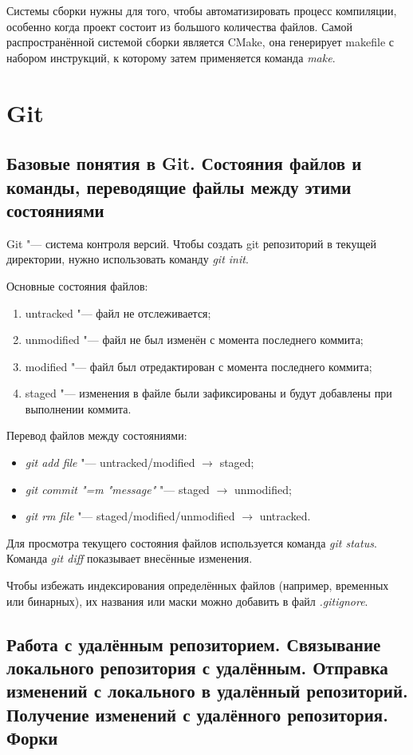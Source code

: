 \documentclass[12pt]{article}
\begin{document}
Системы сборки нужны для того, чтобы автоматизировать процесс компиляции, особенно когда проект состоит из большого количества файлов. Самой распространённой системой сборки является CMake, она генерирует makefile с набором инструкций, к которому затем применяется команда \textit{make}.

\section{Git}

\subsection{Базовые понятия в Git. Состояния файлов и команды, переводящие файлы между этими состояниями}
Git "--- система контроля версий. Чтобы создать git репозиторий в текущей директории, нужно использовать команду \textit{git init}.

Основные состояния файлов:
\begin{enumerate}
\item untracked "--- файл не отслеживается;
\item unmodified "--- файл не был изменён с момента последнего коммита;
\item modified "--- файл был отредактирован с момента последнего коммита;
\item staged "--- изменения в файле были зафиксированы и будут добавлены при выполнении коммита.
\end{enumerate}

Перевод файлов между состояниями:
\begin{itemize}
\item \textit{git add file} "--- untracked/modified $\rightarrow$ staged;
\item \textit{git commit "=m "message"} "--- staged $\rightarrow$ unmodified;
\item \textit{git rm file} "--- staged/modified/unmodified $\rightarrow$ untracked.
\end{itemize}

Для просмотра текущего состояния файлов используется команда \textit{git status}. Команда \textit{git diff} показывает внесённые изменения.

Чтобы избежать индексирования определённых файлов (например, временных или бинарных), их названия или маски можно добавить в файл \textit{.gitignore}. 

\subsection{Работа с удалённым репозиторием. Связывание локального репозитория с удалённым. Отправка изменений с локального в удалённый репозиторий. Получение изменений с удалённого репозитория. Форки}
\end{document}
